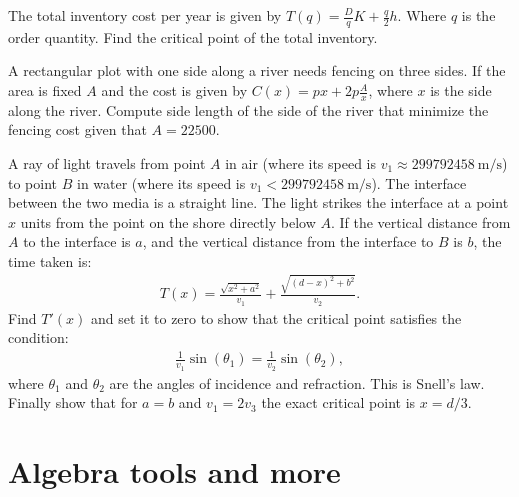 \documentclass[11pt, a4paper, oneside]{article}
\begin{document}
    \boxarea[2cm]


    The total inventory cost per  year is given by \(T(q) = \frac{D}{q}K + \frac{q}{2}h\).
    Where $q$ is the order quantity.
    Find the critical point of the total inventory.

    \boxarea[2cm]


    A rectangular plot with one side along a river needs fencing on three sides.
    If the area is fixed \(A\) and the cost is given by \(C(x) = px + 2p\frac{A}{x}\), where $x$ is the side along the river.
    Compute side length of the side of the river that minimize the fencing cost given that $A=22500$.

    \boxarea[2cm]

\newpage


    A ray of light travels from point $A$ in air (where its speed is $v_1\approx\SI{299 792 458}{\meter\per\second}$) to point $B$ in water (where its speed is $v_1<\SI{299 792 458}{\meter\per\second}$). 
    The interface between the two media is a straight line. 
    The light strikes the interface at a point $x$ units from the point on the shore directly below $A$. 
    If the vertical distance from $A$ to the interface is $a$, and the vertical distance from the interface to $B$ is $b$, the time taken is:
    \begin{gather*}
        T(x) = \frac{\sqrt{x^2+a^2}}{v_1} + \frac{\sqrt{(d-x)^2+b^2}}{v_2}.
    \end{gather*}
    Find \(T'(x)\) and set it to zero to show that the critical point satisfies the condition:
    \begin{gather*}
        \frac{1}{v_1}\sin(\theta_1) = \frac{1}{v_2}\sin(\theta_2),
    \end{gather*}
    where \(\theta_1\) and \(\theta_2\) are the angles of incidence and refraction.
    This is Snell's law.
    Finally show that for $a=b$ and $v_1=2v_3$ the exact critical point is $x=d/3$.

    \section*{Algebra tools and more}
\end{document}
